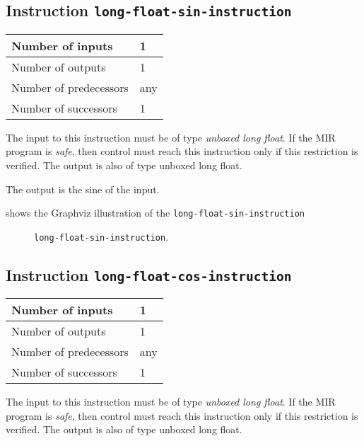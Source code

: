 \subsection{Instruction \texttt{long-float-sin-instruction}}
\label{mir-instruction-long-float-div}

\begin{tabular}{|l|l|}
\hline
Number of inputs & 1\\
\hline
Number of outputs & 1\\
\hline
Number of predecessors & any\\
\hline
Number of successors & 1\\
\hline
\end{tabular}

The input to this instruction must be of type \emph{unboxed long
  float}.  If the MIR program is \emph{safe}, then control must reach
this instruction only if this restriction is verified.  The output is
also of type unboxed long float.

The output is the sine of the input.

 shows the Graphviz illustration of the
\texttt{long-float-sin-instruction}

\begin{figure}
\begin{center}
\end{center}
\caption{\label{fig-long-float-sin-instruction}
\texttt{long-float-sin-instruction}.}
\end{figure}

\subsection{Instruction \texttt{long-float-cos-instruction}}
\label{mir-instruction-long-float-div}

\begin{tabular}{|l|l|}
\hline
Number of inputs & 1\\
\hline
Number of outputs & 1\\
\hline
Number of predecessors & any\\
\hline
Number of successors & 1\\
\hline
\end{tabular}

The input to this instruction must be of type \emph{unboxed long
  float}.  If the MIR program is \emph{safe}, then control must reach
this instruction only if this restriction is verified.  The output is
also of type unboxed long float.

